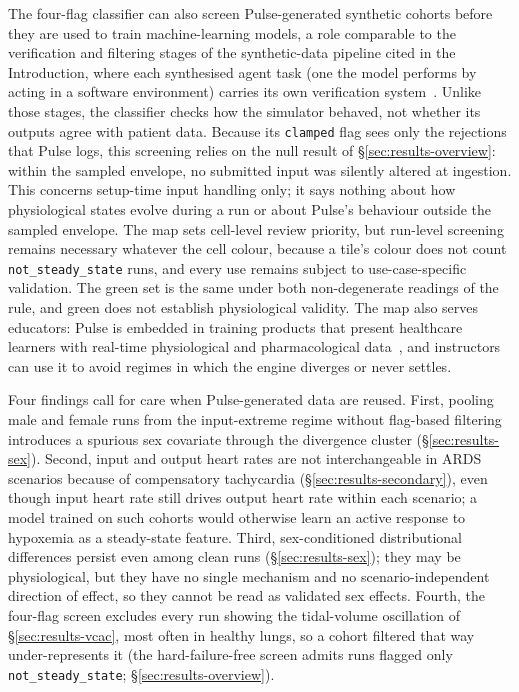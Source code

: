 \documentclass[pdflatex,sn-nature]{sn-jnl}%
\begin{document}
The four-flag classifier can also screen Pulse-generated synthetic cohorts before they are used to train machine-learning models, a role comparable to the verification and filtering stages of the synthetic-data pipeline cited in the Introduction, where each synthesised agent task (one the model performs by acting in a software environment) carries its own verification system~\cite{deepseek2026v41flash}. Unlike those stages, the classifier checks how the simulator behaved, not whether its outputs agree with patient data. Because its \texttt{clamped} flag sees only the rejections that Pulse logs, this screening relies on the null result of \S\ref{sec:results-overview}: within the sampled envelope, no submitted input was silently altered at ingestion. This concerns setup-time input handling only; it says nothing about how physiological states evolve during a run or about Pulse's behaviour outside the sampled envelope. The map sets cell-level review priority, but run-level screening remains necessary whatever the cell colour, because a tile's colour does not count \texttt{not\_steady\_state} runs, and every use remains subject to use-case-specific validation. The green set is the same under both non-degenerate readings of the rule, and green does not establish physiological validity. The map also serves educators: Pulse is embedded in training products that present healthcare learners with real-time physiological and pharmacological data~\cite{pulseinaction}, and instructors can use it to avoid regimes in which the engine diverges or never settles.

Four findings call for care when Pulse-generated data are reused. First, pooling male and female runs from the input-extreme regime without flag-based filtering introduces a spurious sex covariate through the divergence cluster (\S\ref{sec:results-sex}). Second, input and output heart rates are not interchangeable in ARDS scenarios because of compensatory tachycardia (\S\ref{sec:results-secondary}), even though input heart rate still drives output heart rate within each scenario; a model trained on such cohorts would otherwise learn an active response to hypoxemia as a steady-state feature. Third, sex-conditioned distributional differences persist even among clean runs (\S\ref{sec:results-sex}); they may be physiological, but they have no single mechanism and no scenario-independent direction of effect, so they cannot be read as validated sex effects. Fourth, the four-flag screen excludes every run showing the tidal-volume oscillation of \S\ref{sec:results-vcac}, most often in healthy lungs, so a cohort filtered that way under-represents it (the hard-failure-free screen admits runs flagged only \texttt{not\_steady\_state}; \S\ref{sec:results-overview}).
\end{document}
